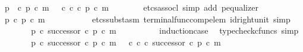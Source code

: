 \begin{isabellebody}
\ {\isachardoublequoteopen}p\ \ {\isasymcirc}\isactrlsub c\ p{\isacharprime}{\kern0pt}\ {\isasymcirc}\isactrlsub c\ m\ {\isacharequal}{\kern0pt}\ {\isasymt}\ {\isasymcirc}\isactrlsub c\ {\isasymbeta}\isactrlbsub {\isasymnat}\isactrlsub c\isactrlesub \ {\isasymcirc}\isactrlsub c\ p{\isacharprime}{\kern0pt}\ {\isasymcirc}\isactrlsub c\ m{\isachardoublequoteclose}\isanewline
\ \ \ \ \ \ \isamarkupfalse%
\ {\isacharparenleft}{\kern0pt}etcs{\isacharunderscore}{\kern0pt}assocl{\isacharcomma}{\kern0pt}\ simp\ add{\isacharcolon}{\kern0pt}\ p{\isacharprime}{\kern0pt}{\isacharunderscore}{\kern0pt}equalizer{\isacharparenright}{\kern0pt}\isanewline
\ \ \ \ \isamarkupfalse%
\ \isamarkupfalse%
\ {\isachardoublequoteopen}p\ {\isasymcirc}\isactrlsub c\ p{\isacharprime}{\kern0pt}\ {\isasymcirc}\isactrlsub c\ m\ {\isacharequal}{\kern0pt}\ {\isasymt}{\isachardoublequoteclose}\isanewline
\ \ \ \ \ \ \isamarkupfalse%
\ {\isacharparenleft}{\kern0pt}{\isacharminus}{\kern0pt}{\isacharcomma}{\kern0pt}\ etcs{\isacharunderscore}{\kern0pt}subst{\isacharunderscore}{\kern0pt}asm\ terminal{\isacharunderscore}{\kern0pt}func{\isacharunderscore}{\kern0pt}comp{\isacharunderscore}{\kern0pt}elem\ id{\isacharunderscore}{\kern0pt}right{\isacharunderscore}{\kern0pt}unit{}{\isacharcomma}{\kern0pt}\ simp{\isacharparenright}{\kern0pt}\isanewline
\ \ \ \ \isamarkupfalse%
\ \isamarkupfalse%
\ {\isachardoublequoteopen}p\ {\isasymcirc}\isactrlsub c\ successor\ {\isasymcirc}\isactrlsub c\ p{\isacharprime}{\kern0pt}\ {\isasymcirc}\isactrlsub c\ m\ {\isacharequal}{\kern0pt}\ {\isasymt}{\isachardoublequoteclose}\isanewline
\ \ \ \ \ \ \isamarkupfalse%
\ induction{\isacharunderscore}{\kern0pt}case\ \isamarkupfalse%
\ {\isacharparenleft}{\kern0pt}typecheck{\isacharunderscore}{\kern0pt}cfuncs{\isacharcomma}{\kern0pt}\ simp{\isacharparenright}{\kern0pt}\isanewline
\ \ \ \ \isamarkupfalse%
\ \isamarkupfalse%
\ {\isachardoublequoteopen}{\isacharparenleft}{\kern0pt}p\ {\isasymcirc}\isactrlsub c\ successor\ {\isasymcirc}\isactrlsub c\ p{\isacharprime}{\kern0pt}{\isacharparenright}{\kern0pt}\ {\isasymcirc}\isactrlsub c\ m\ {\isacharequal}{\kern0pt}\ {\isacharparenleft}{\kern0pt}{\isacharparenleft}{\kern0pt}{\isasymt}\ {\isasymcirc}\isactrlsub c\ {\isasymbeta}\isactrlbsub {\isasymnat}\isactrlsub c\isactrlesub {\isacharparenright}{\kern0pt}\ {\isasymcirc}\isactrlsub c\ successor\ {\isasymcirc}\isactrlsub c\ p{\isacharprime}{\kern0pt}{\isacharparenright}{\kern0pt}\ {\isasymcirc}\isactrlsub c\ m{\isachardoublequoteclose}\isanewline

\end{isabellebody}
